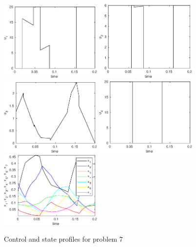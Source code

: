 \begin{figure}[htb]
\includegraphics[width=0.45\textwidth]{examples/problem7/graphs/u1_4210.eps}
\includegraphics[width=0.45\textwidth]{examples/problem7/graphs/u2_4210.eps}
\includegraphics[width=0.45\textwidth]{examples/problem7/graphs/u3_4210.eps}
\includegraphics[width=0.45\textwidth]{examples/problem7/graphs/u4_4210.eps}
\includegraphics[width=0.45\textwidth]{examples/problem7/graphs/x17_4210.eps}
\caption{Control and state profiles for problem 7} \label{fig:prob7}
\end{figure}


